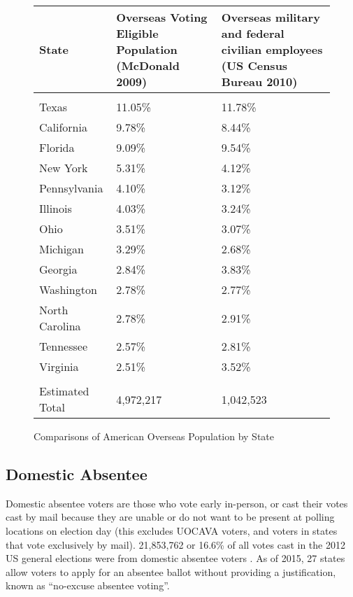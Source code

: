
\begin{figure}
\begin{center}
\begin{tabular}{l p{} p{}} %
  {\bf State} &
  {\bf Overseas Voting Eligible \newline Population} \newline(McDonald 2009) &
  {\bf Overseas military and federal \newline civilian employees}
  \newline(US Census Bureau 2010)\\\hline\\
Texas & 11.05\% & 11.78\%\\
California & 9.78\% & 8.44\% \\
Florida & 9.09\% & 9.54\% \\
New York & 5.31\% & 4.12\% \\
Pennsylvania & 4.10\% & 3.12\% \\
Illinois & 4.03\% & 3.24\% \\
Ohio & 3.51\% & 3.07\% \\
Michigan & 3.29\% & 2.68\% \\
Georgia & 2.84\% & 3.83\% \\
Washington & 2.78\% & 2.77\% \\
North Carolina & 2.78\% & 2.91\% \\
Tennessee & 2.57\% & 2.81\% \\
Virginia & 2.51\% & 3.52\% \\\hline\\
Estimated Total & 4,972,217 & 1,042,523
\end{tabular}
\end{center}
\caption{Comparisons of American Overseas Population by State}
\label{fig:uocava_populations} %
\end{figure}

\subsection{Domestic Absentee}
Domestic absentee voters are those who vote early in-person, or cast
their votes cast by mail because they are unable or do not want to be
present at polling locations on election day (this excludes UOCAVA
voters, and voters in states that vote exclusively by
mail). 21,853,762 or 16.6\% of all votes cast in the 2012 US general
elections were from domestic absentee voters \cite{eac2012survey}. As
of 2015, 27 states allow voters to apply for an absentee ballot
without providing a justification, known as ``no-excuse absentee
voting''.

